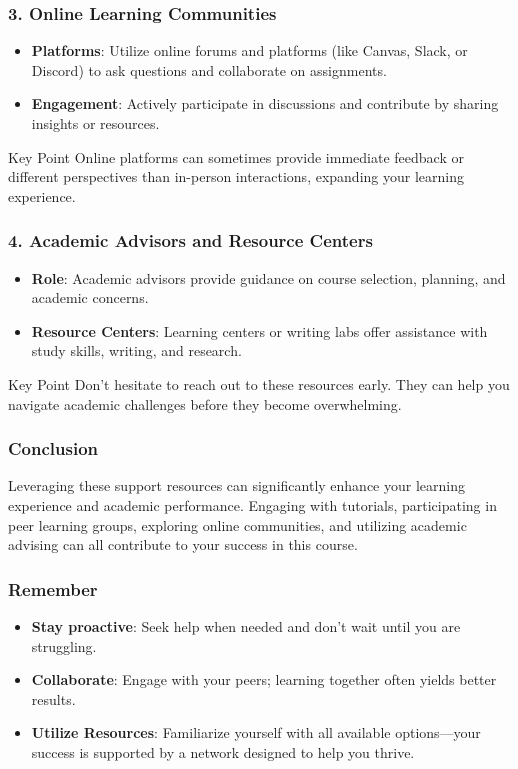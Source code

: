 \documentclass[aspectratio=169]{beamer}
\begin{document}
\begin{frame}[fragile]
    \frametitle{3. Online Learning Communities}
    \begin{itemize}
        \item \textbf{Platforms}: Utilize online forums and platforms (like Canvas, Slack, or Discord) to ask questions and collaborate on assignments.
        \item \textbf{Engagement}: Actively participate in discussions and contribute by sharing insights or resources.
    \end{itemize}
    \begin{block}{Key Point}
        Online platforms can sometimes provide immediate feedback or different perspectives than in-person interactions, expanding your learning experience.
    \end{block}
\end{frame}

\begin{frame}[fragile]
    \frametitle{4. Academic Advisors and Resource Centers}
    \begin{itemize}
        \item \textbf{Role}: Academic advisors provide guidance on course selection, planning, and academic concerns.
        \item \textbf{Resource Centers}: Learning centers or writing labs offer assistance with study skills, writing, and research.
    \end{itemize}
    \begin{block}{Key Point}
        Don’t hesitate to reach out to these resources early. They can help you navigate academic challenges before they become overwhelming.
    \end{block}
\end{frame}

\begin{frame}[fragile]
    \frametitle{Conclusion}
    Leveraging these support resources can significantly enhance your learning experience and academic performance. Engaging with tutorials, participating in peer learning groups, exploring online communities, and utilizing academic advising can all contribute to your success in this course.
\end{frame}

\begin{frame}[fragile]
    \frametitle{Remember}
    \begin{itemize}
        \item \textbf{Stay proactive}: Seek help when needed and don’t wait until you are struggling.
        \item \textbf{Collaborate}: Engage with your peers; learning together often yields better results.
        \item \textbf{Utilize Resources}: Familiarize yourself with all available options—your success is supported by a network designed to help you thrive.
    \end{itemize}
\end{frame}
\end{document}
